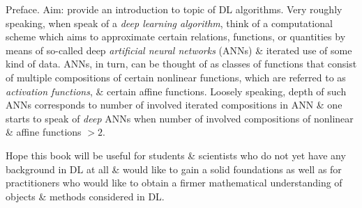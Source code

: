 \documentclass{article}
\begin{document}
{\sf Preface.} Aim: provide an introduction to topic of DL algorithms. Very roughly speaking, when speak of a {\it deep learning algorithm}, think of a computational scheme which aims to approximate certain relations, functions, or quantities by means of so-called deep {\it artificial neural networks} (ANNs) \& iterated use of some kind of data. ANNs, in turn, can be thought of as classes of functions that consist of multiple compositions of certain nonlinear functions, which are referred to as {\it activation functions}, \& certain affine functions. Loosely speaking, depth of such ANNs corresponds to number of involved iterated compositions in ANN \& one starts to speak of {\it deep} ANNs when number of involved compositions of nonlinear \& affine functions $> 2$.

Hope this book will be useful for students \& scientists who do not yet have any background in DL at all \& would like to gain a solid foundations as well as for practitioners who would like to obtain a firmer mathematical understanding of objects \& methods considered in DL.
\end{document}
